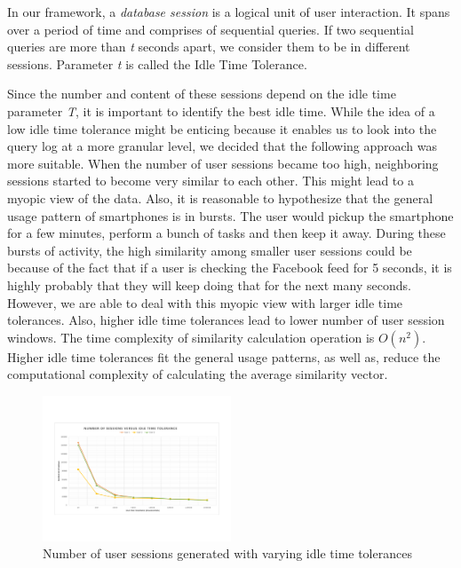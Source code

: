In our framework, a \textit{database session} is a logical unit of user interaction. It spans over a period of time and comprises of sequential queries. If two sequential queries are more than \textit{t} seconds apart, we consider them to be in different sessions. Parameter \textit{t} is called the Idle Time Tolerance. 

Since the number and content of these sessions depend on the idle time parameter \textit{T}, it is important to identify the best idle time. While the idea of a low idle time tolerance might be enticing because it enables us to look into the query log at a more granular level, we decided that the following approach was more suitable. When the number of user sessions became too high, neighboring sessions started to become very similar to each other. This might lead to a myopic view of the data. Also, it is reasonable to hypothesize that the general usage pattern of smartphones is in bursts. The user would pickup the smartphone for a few minutes, perform a bunch of tasks and then keep it away. During these bursts of activity, the high similarity among smaller user sessions could be because of the fact that if a user is checking the Facebook feed for 5 seconds, it is highly probably that they will keep doing that for the next many seconds. However, we are able to deal with this myopic view with larger idle time tolerances. Also, higher idle time tolerances lead to lower number of user session windows. The time complexity of similarity calculation operation is $O(n^2)$. Higher idle time tolerances fit the general usage patterns, as well as, reduce the computational complexity of calculating the average similarity vector.  

\begin{figure}
    \centering
    \includegraphics[width=0.5\textwidth]{graphics/IdleTimeTolerances}
    \caption{Number of user sessions generated with varying idle time tolerances}
    \label{fig:idletime}
\end{figure}

